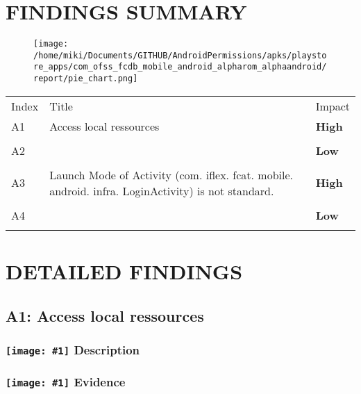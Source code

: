 \documentclass[12p]{article}
\newcommand{\icon}[1]{\texttt{[image: \#1]}}
\begin{document}
\section{FINDINGS SUMMARY}\label{sec:summary}
\begin{figure}[H]
\centering
	\texttt{[image: /home/miki/Documents/GITHUB/AndroidPermissions/apks/playstore\_apps/com\_ofss\_fcdb\_mobile\_android\_alpharom\_alphaandroid/report/pie\_chart.png]}
\end{figure}
	\begin{longtable}{p{0.5cm} p{10cm} p{1.5cm}}
	\rowcolor{grannysmithapple!70} Index & Title & Impact \\
	A1&Access local ressources& \color{ferrarired}\textbf{High} \\
\hline\\	A2&& \color{amber}\textbf{Low} \\
\hline\\	A3&Launch Mode of Activity \newline (com. iflex. fcat. mobile. android. infra. LoginActivity) is not standard.& \color{ferrarired}\textbf{High} \\
\hline\\	A4&& \color{amber}\textbf{Low} \\
\hline\\	\end{longtable}
\cleardoublepage
\newpage
\section{DETAILED FINDINGS}
\subsection{A1: Access local ressources}
\subsubsection*{\protect\icon{/home/miki/Documents/GITHUB/AndroidPermissions/python/vulns/report_icons/basic_sheet.png} Description}

\subsubsection*{\protect\icon{/home/miki/Documents/GITHUB/AndroidPermissions/python/vulns/report_icons/basic_magnifier.png} Evidence}
\end{document}
